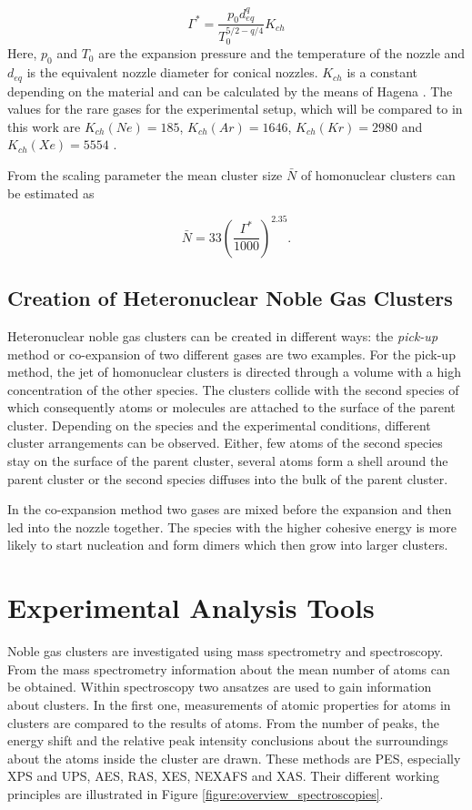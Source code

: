 \begin{equation}
 \Gamma^* = \frac{p_0 d_{eq}^q}{T_0^{5/2-q/4}} K_{ch}
\end{equation}
Here, $p_0$ and $T_0$ are the expansion pressure and the temperature
of the nozzle and $d_{eq}$ is the equivalent nozzle diameter for conical
nozzles. $K_{ch}$ is a constant depending on the material and can be
calculated by the means of Hagena \cite{Hagena87}. The values for the rare gases for
the experimental setup, which will be compared to in this work are
$K_{ch}(Ne)=185$, $K_{ch}(Ar)=1646$, $K_{ch}(Kr)=2980$ and $K_{ch}(Xe)=5554$
\cite{PhDFoerstel}.

From the scaling parameter the mean cluster size $\bar{N}$ 
of homonuclear clusters can be
estimated as

\begin{equation}
  \bar{N} = 33 \left( \frac{\Gamma^*}{1000} \right) ^{2.35} .
\end{equation}


\subsection{Creation of Heteronuclear Noble Gas Clusters}
Heteronuclear noble gas clusters can be created in different ways:
the \emph{pick-up} method or co-expansion of two different gases are two examples.
For the pick-up method, the jet of homonuclear clusters is directed through
a volume with a high concentration of the other species. The clusters
collide with the second species of which consequently atoms or molecules
are attached to the surface
of the parent cluster. Depending on the species
and the experimental conditions, different cluster arrangements can be observed.
Either, few atoms
of the second species stay on the surface of the parent cluster,
several atoms form a shell around the parent cluster or the second species
diffuses into the bulk of the parent cluster.

In the co-expansion method two gases are mixed before the expansion and
then led into the nozzle together. The species with the higher cohesive
energy is more likely to start nucleation and form dimers which
then grow into larger clusters.



\section{Experimental Analysis Tools}
Noble gas clusters are investigated using mass spectrometry and spectroscopy.
From the mass spectrometry information about the mean number of atoms
can be obtained. Within spectroscopy two ansatzes are used
to gain information about clusters. In the first one, measurements of
atomic properties for atoms in clusters are compared to the results of
atoms. From the number of peaks, the energy shift and the relative peak
intensity conclusions about the surroundings about the atoms inside
the cluster are drawn. These methods are \ac{PES}, especially \ac{XPS}
and \ac{UPS}, \ac{AES}, \ac{RAS}, \ac{XES}, \ac{NEXAFS} and \ac{XAS}.
Their different working principles are illustrated in Figure
\ref{figure:overview_spectroscopies}.

